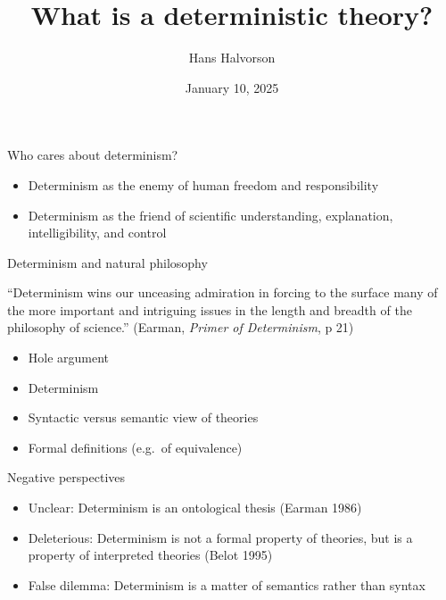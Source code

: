 \documentclass[fleqn]{beamer}
\title{What is a deterministic theory?}
\author{Hans Halvorson}
\date{January 10, 2025}
\begin{document}
\begin{frame}
    \titlepage
\end{frame}

\begin{frame}{Who cares about determinism?}

 \begin{itemize}
 \item Determinism as the enemy of human freedom and responsibility
 \item Determinism as the friend of scientific understanding,
   explanation, intelligibility, and control
 \end{itemize}


\end{frame}
  

\begin{frame}{Determinism and natural philosophy}

  ``Determinism wins our unceasing admiration in forcing to the
  surface many of the more important and intriguing issues in the
  length and breadth of the philosophy of science.'' (Earman,
  \emph{Primer of Determinism}, p 21)

  \begin{itemize}
  \item Hole argument
  \item Determinism
  \item Syntactic versus semantic view of theories
  \item Formal definitions (e.g.\ of equivalence)
  \end{itemize}  

\end{frame}

\begin{frame}{Negative perspectives}

  \begin{itemize}
  \item Unclear: Determinism is an ontological thesis (Earman 1986)
  \item Deleterious: Determinism is not a formal property of theories,
    but is a property of interpreted theories (Belot 1995)
  \item False dilemma: Determinism is a matter of semantics rather
    than syntax

  \end{itemize}

\end{frame}
\end{document}
